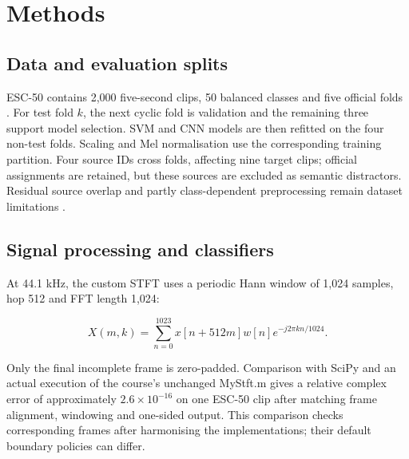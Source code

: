 \documentclass[a4paper,10pt]{article}
\begin{document}
\section{Methods}

\subsection{Data and evaluation splits}\label{sec:data}

ESC-50 contains 2,000 five-second clips, 50 balanced classes and five official folds \cite{esc}. For test fold $k$, the next cyclic fold is validation and the remaining three support model selection. SVM and CNN models are then refitted on the four non-test folds. Scaling and Mel normalisation use the corresponding training partition. Four source IDs cross folds, affecting nine target clips; official assignments are retained, but these sources are excluded as semantic distractors. Residual source overlap and partly class-dependent preprocessing remain dataset limitations \cite{esc}.

\subsection{Signal processing and classifiers}

At 44.1 kHz, the custom STFT uses a periodic Hann window of 1,024 samples, hop 512 and FFT length 1,024:

\[
X(m,k)=\sum_{n=0}^{1023}x[n+512m]w[n]e^{-j2\pi kn/1024}.
\]

Only the final incomplete frame is zero-padded. Comparison with SciPy and an actual execution of the course's unchanged MyStft.m gives a relative complex error of approximately $2.6\times10^{-16}$ on one ESC-50 clip after matching frame alignment, windowing and one-sided output. This comparison checks corresponding frames after harmonising the implementations; their default boundary policies can differ.
\end{document}
